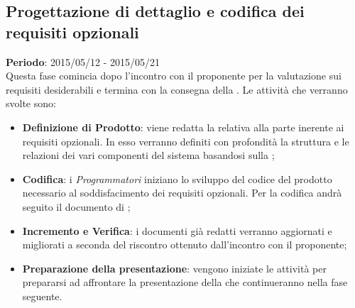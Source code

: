 	\subsection{Progettazione di dettaglio e codifica dei requisiti opzionali} %
	\label{sub:progettazione_di_dettaglio_e_codifica_dei_requisiti_opzionali}
	\textbf{Periodo}:  2015/05/12 - 2015/05/21 \\
	Questa fase comincia dopo l'incontro con il proponente per la valutazione sui requisiti desiderabili e termina con la consegna della \RQ.
	Le attività che verranno svolte sono:
		\begin{itemize}
			\item \textbf{Definizione di Prodotto}: viene redatta la \docNameVersionDdP{} relativa alla parte inerente ai requisiti opzionali. In esso verranno definiti con profondità la struttura e le relazioni dei vari componenti del sistema basandosi sulla \docNameVersionST;
			\item \textbf{Codifica}: i \emph{Programmatori} iniziano lo sviluppo del codice del prodotto necessario al soddisfacimento dei requisiti opzionali. Per la codifica andrà seguito il documento di \docNameVersionDdP;
			\item \textbf{Incremento e Verifica}: i documenti già redatti verranno aggiornati e migliorati a seconda del riscontro ottenuto dall'incontro con il proponente;
			\item \textbf{Preparazione della presentazione}: vengono iniziate le attività per prepararsi ad affrontare la presentazione della \RQ{} che continueranno nella fase seguente.
		\end{itemize}
			
